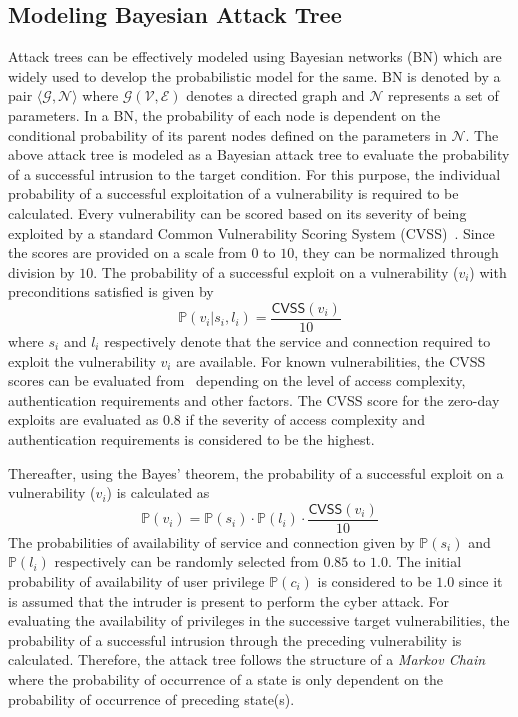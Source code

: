 \subsection{Modeling Bayesian Attack Tree}
Attack trees can be effectively modeled using Bayesian networks (BN) which are widely used to develop the probabilistic model for the same. BN is denoted by a pair $\langle\mathcal{G},\mathcal{N}\rangle$ where $\mathcal{G}(\mathcal{V},\mathcal{E})$ denotes a directed graph and $\mathcal{N}$ represents a set of parameters. In a BN, the probability of each node is dependent on the conditional probability of its parent nodes defined on the parameters in $\mathcal{N}$. The above attack tree is modeled as a Bayesian attack tree to evaluate the probability of a successful intrusion to the target condition. For this purpose, the individual probability of a successful exploitation of a vulnerability is required to be calculated. Every vulnerability can be scored based on its severity of being exploited by a standard Common Vulnerability Scoring System (CVSS)~\cite{cvss}. Since the scores are provided on a scale from $0$ to $10$, they can be normalized through division by $10$. The probability of a successful exploit on a vulnerability ($v_i$) with preconditions satisfied is given by
\begin{equation}
\mathbb{P}(v_i|s_i,l_i)=\dfrac{\mathsf{CVSS}(v_i)}{10}
\end{equation}
where $s_i$ and $l_i$ respectively denote that the service and connection required to exploit the vulnerability $v_i$ are available. For known vulnerabilities, the CVSS scores can be evaluated from~\cite{nist1,nist2} depending on the level of access complexity, authentication requirements and other factors. The CVSS score for the zero-day exploits are evaluated as $0.8$ if the severity of access complexity and authentication requirements is considered to be the highest. 

Thereafter, using the Bayes' theorem, the probability  of a successful exploit on a vulnerability ($v_i$) is calculated as
\begin{equation}
\mathbb{P}(v_i)=\mathbb{P}(s_i)\cdot\mathbb{P}(l_i)\cdot\dfrac{\mathsf{CVSS}(v_i)}{10}
\end{equation}
The probabilities of availability of service and connection given by $\mathbb{P}(s_i)$ and $\mathbb{P}(l_i)$ respectively can be randomly selected from $0.85$ to $1.0$. The initial probability of availability of user privilege $\mathbb{P}(c_i)$ is considered to be $1.0$ since it is assumed that the intruder is present to perform the cyber attack. For evaluating the availability of privileges in the successive target vulnerabilities, the probability of a successful intrusion through the preceding vulnerability is calculated. Therefore, the attack tree follows the structure of a \textit{Markov Chain} where the probability of occurrence of a state is only dependent on the probability of occurrence of preceding state(s). 

